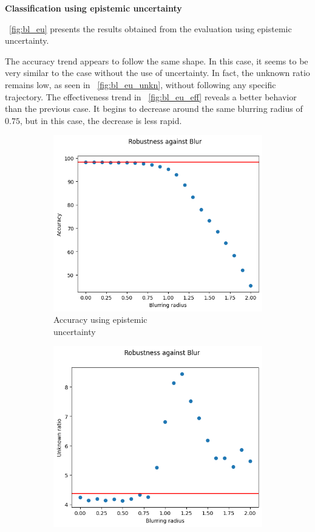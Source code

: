 \vspace{0.3cm}
\textbf{Classification using epistemic uncertainty}
\vspace{0.1cm}

\Fig~\ref{fig:bl_eu} presents the results obtained from the evaluation using epistemic uncertainty.

The accuracy trend appears to follow the same shape. In this case, it seems to be very similar to the case without the use of uncertainty. In fact, the unknown ratio remains low, as seen in \Fig~\ref{fig:bl_eu_unkn}, without following any specific trajectory. The effectiveness trend in \Fig~\ref{fig:bl_eu_eff} reveals a better behavior than the previous case. It begins to decrease around the same blurring radius of $0.75$, but in this case, the decrease is less rapid.

\begin{figure}[h]
	\centering
	\begin{subfigure}{.33\textwidth}
		\centering
		\includegraphics[width=0.9\linewidth]{ImageFiles/EvalBNN/BL/EU/acc}
		\caption{Accuracy using epistemic \\ uncertainty}
		\label{fig:bl_eu_acc}
	\end{subfigure}%
	\begin{subfigure}{.33\textwidth}
		\centering
		\includegraphics[width=0.9\linewidth]{ImageFiles/EvalBNN/BL/EU/unkn}

\end{subfigure}
\end{figure}
